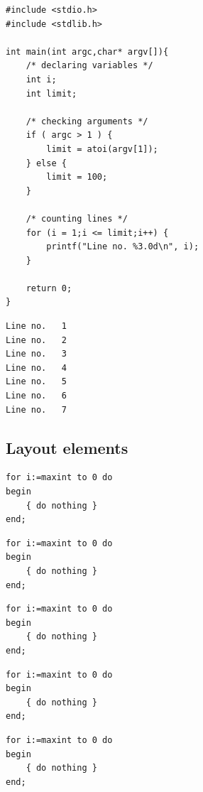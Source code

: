 \documentclass{article}
\begin{document}
{\lstset{numbers=left,numberstyle=\tiny,stepnumber=1,numbersep=5pt}
\begin{lstlisting}[name=Test,
    language={[ansi]C},
    linerange={1-4,6-7,10-14,
    17-19,21-22},
    firstnumber=1]
#include <stdio.h>
#include <stdlib.h>

int main(int argc,char* argv[]){
    /* declaring variables */
    int i;
    int limit;

    /* checking arguments */
    if ( argc > 1 ) {
        limit = atoi(argv[1]);
    } else {
        limit = 100;
    }

    /* counting lines */
    for (i = 1;i <= limit;i++) {
        printf("Line no. %3.0d\n", i);
    }

    return 0;
}

\end{lstlisting}

\begin{lstlisting}[language={},
    linerange={1-2,6-7},
    consecutivenumbers=false]
Line no.   1
Line no.   2
Line no.   3
Line no.   4
Line no.   5
Line no.   6
Line no.   7
\end{lstlisting}}

\subsection{Layout elements}

\begin{lstlisting}[frame=single]
for i:=maxint to 0 do
begin
    { do nothing }
end;
\end{lstlisting}

\begin{lstlisting}[frame=trBL]
for i:=maxint to 0 do
begin
    { do nothing }
end;
\end{lstlisting}

{\lstset{frameround=fttt}
\begin{lstlisting}[frame=trBL]
for i:=maxint to 0 do
begin
    { do nothing }
end;
\end{lstlisting}}

{\lstset{xleftmargin=.05\linewidth}
\begin{lstlisting}[caption={Useless code},label=useless]
for i:=maxint to 0 do
begin
    { do nothing }
end;
\end{lstlisting}}

{\lstset{xleftmargin=.05\linewidth}
\begin{lstlisting}[title={`Caption' without label}]
for i:=maxint to 0 do
begin
    { do nothing }
end;
\end{lstlisting}}
\end{document}
